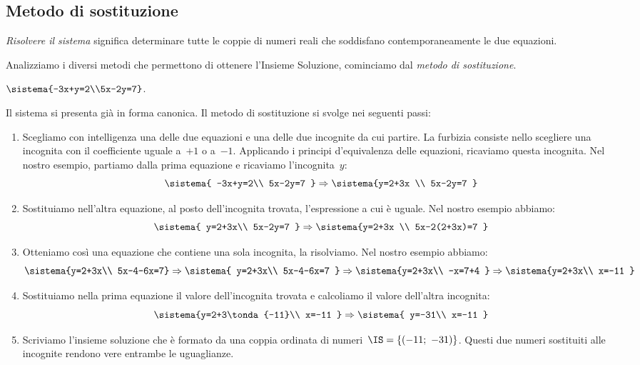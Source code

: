 \subsection{Metodo di sostituzione}
\emph{Risolvere il sistema} significa determinare tutte le coppie di
numeri reali che soddisfano contemporaneamente le due equazioni.

Analizziamo i diversi metodi che permettono di ottenere
l'Insieme Soluzione, cominciamo dal \emph{metodo di sostituzione}.

\begin{esempio}
\(\sistema{-3x+y=2\\5x-2y=7}\).
\end{esempio}

Il sistema si presenta già in forma canonica. Il metodo di
sostituzione si svolge nei seguenti passi:

\begin{enumerate}
 \item Scegliamo con intelligenza una delle due equazioni e una
delle due incognite da cui partire. 
La furbizia consiste nello scegliere una incognita con il coefficiente uguale 
a~\(+1\) o a~\(-1\).
Applicando i principi d'equivalenza delle equazioni, ricaviamo questa
incognita.
Nel nostro esempio, partiamo dalla prima equazione e ricaviamo
l'incognita~\(y\):
\[\sistema{
     -3x+y=2\\
     5x-2y=7
  }
\Rightarrow
  \sistema{y=2+3x \\
           5x-2y=7
  }
\]

 \item Sostituiamo nell'altra equazione, al posto
dell'incognita trovata, l'espressione a cui è uguale. 
Nel nostro esempio abbiamo:
\[\sistema{
     y=2+3x\\
     5x-2y=7
  }
\Rightarrow
\sistema{y=2+3x \\
         5x-2(2+3x)=7
}\]

 \item Otteniamo così una equazione che contiene una sola 
incognita, la risolviamo.
Nel nostro esempio abbiamo:
\[\sistema{y=2+3x\\
5x-4-6x=7}\Rightarrow
\sistema{
         y=2+3x\\
         5x-4-6x=7
        }\Rightarrow
 \sistema{y=2+3x\\
         -x=7+4
        }\Rightarrow
 \sistema{y=2+3x\\
         x=-11
  }\]

 \item Sostituiamo nella prima equazione il valore dell'incognita trovata e 
calcoliamo il valore dell'altra incognita:
\[ \sistema{y=2+3\tonda{-11}\\
         x=-11
  }\Rightarrow
  \sistema{
         y=-31\\
         x=-11
  }\]

 \item Scriviamo l'insieme soluzione che è formato da una coppia ordinata 
 di numeri~\(\IS=\{(-11;~-31)\}\). Questi due numeri sostituiti alle 
 incognite rendono vere entrambe le uguaglianze.
\end{enumerate}

